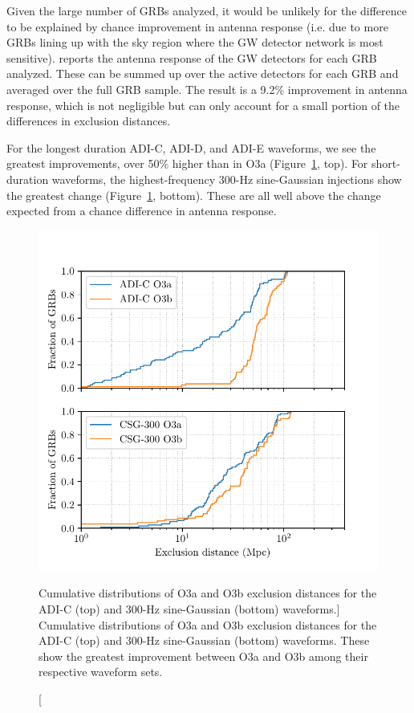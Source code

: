 Given the large number of GRBs analyzed, it would be unlikely for the difference to be explained by chance improvement in antenna response (i.e. due to more GRBs lining up with the sky region where the GW detector network is most sensitive).
\xpip reports the antenna response of the GW detectors for each GRB analyzed.
These can be summed up over the active detectors for each GRB and averaged over the full GRB sample.
The result is a 9.2\% improvement in antenna response, which is not negligible but can only account for a small portion of the differences in exclusion distances.

For the longest duration ADI-C, ADI-D, and ADI-E waveforms, we see the greatest improvements, over 50\% higher than in O3a (Figure~\ref{fig:grb-o3b-compare-o3a}, top).
For short-duration waveforms, the highest-frequency 300-Hz sine-Gaussian injections show the greatest change (Figure~\ref{fig:grb-o3b-compare-o3a}, bottom).
These are all well above the change expected from a chance difference in antenna response.

\begin{figure}[h]
  \centering
  \includegraphics{figures/grb/compare-o3a.pdf}
  \caption
	[Cumulative distributions of O3a and O3b exclusion distances for the ADI-C (top) and 300-Hz sine-Gaussian (bottom) waveforms.]
	{Cumulative distributions of O3a and O3b exclusion distances for the ADI-C (top) and 300-Hz sine-Gaussian (bottom) waveforms.
	These show the greatest improvement between O3a and O3b among their respective waveform sets.}
  \label{fig:grb-o3b-compare-o3a}
\end{figure}

